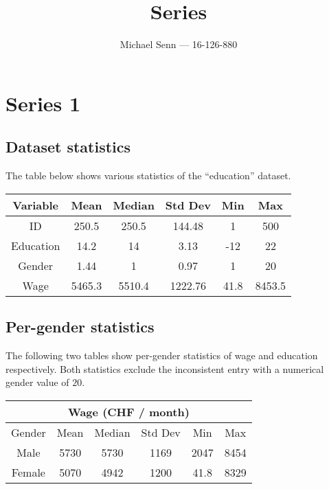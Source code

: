 \documentclass[a4paper]{scrreprt}
\title{Series \series}
\author{Michael Senn \maillink{michael.senn@students.unibe.ch} --- 16-126-880}
\date{\printdate}
\newcommand{\series}{1}
\begin{document}
\maketitle


\setcounter{chapter}{\numexpr \series - 1 \relax}

\chapter{Series \series}

\section{Dataset statistics}

The table below shows various statistics of the ``education'' dataset.
\\

\begin{tabular}{c c c c c c}
		\toprule
		Variable & Mean & Median & Std Dev & Min & Max \\
		\midrule
		ID & 250.5 & 250.5 & 144.48 & 1 & 500 \\
		Education & 14.2 & 14 & 3.13 & -12 & 22 \\
		Gender & 1.44 & 1 & 0.97 & 1 & 20 \\
		Wage & 5465.3 & 5510.4 & 1222.76 & 41.8 & 8453.5 \\
		\bottomrule
\end{tabular}

\section{Per-gender statistics}

The following two tables show per-gender statistics of wage and education
respectively. Both statistics exclude the inconsistent entry with a numerical
gender value of $20$.
\\

\begin{tabular}{c c c c c c }
		\multicolumn{6}{c}{\textbf{Wage} (CHF / month)} \\
		\toprule
		Gender & Mean & Median & Std Dev & Min & Max \\
		\midrule
		Male       & 5730       & 5730      & 1169   & 2047      & 8454 \\
		Female     & 5070       & 4942      & 1200   &   41.8    & 8329 \\
		\bottomrule
\end{tabular}
\\\\
\end{document}
